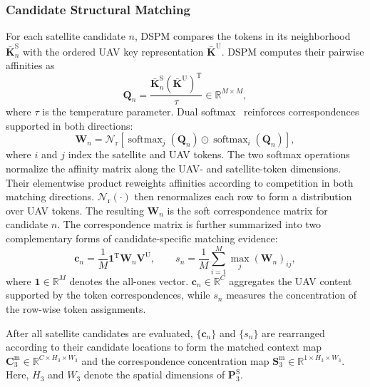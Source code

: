 \documentclass[runningheads]{llncs}
\begin{document}
\subsubsection{Candidate Structural Matching}

For each satellite candidate $n$, DSPM compares the tokens in its neighborhood $\bar{\mathbf{K}}_{n}^{\mathrm{S}}$ with the ordered UAV key representation $\bar{\mathbf{K}}^{\mathrm{U}}$. DSPM computes their pairwise affinities as 
\begin{equation}
\mathbf{Q}_{n}
=
\frac{
\bar{\mathbf{K}}_{n}^{\mathrm{S}}
(\bar{\mathbf{K}}^{\mathrm{U}})^{\mathrm{T}}
}{\tau}
\in \mathbb{R}^{M\times M},
\label{eq:dspm_affinity}
\end{equation}
where $\tau$ is the temperature parameter. Dual softmax~\cite{sun2021loftr} reinforces correspondences supported in both directions:
\begin{equation}
\mathbf{W}_{n}
=
\mathcal{N}_{\mathrm{r}}\!\left[
\operatorname{softmax}_{j}(\mathbf{Q}_{n})
\odot
\operatorname{softmax}_{i}(\mathbf{Q}_{n})
\right],
\label{eq:dspm_matching}
\end{equation}
where $i$ and $j$ index the satellite and UAV tokens. The two softmax operations normalize the affinity matrix along the UAV- and satellite-token dimensions. Their elementwise product reweights affinities according to competition in both matching directions. $\mathcal{N}_{\mathrm{r}}(\cdot)$ then renormalizes each row to form a distribution over UAV tokens. The resulting $\mathbf{W}_{n}$ is the soft correspondence matrix for candidate $n$. The correspondence matrix is further summarized into two complementary forms of candidate-specific matching evidence:
\begin{equation}
\mathbf{c}_{n}
=
\frac{1}{M}
\mathbf{1}^{\mathrm{T}}
\mathbf{W}_{n}
\mathbf{V}^{\mathrm{U}},
\qquad
s_{n}
=
\frac{1}{M}
\sum_{i=1}^{M}
\max_{j}
(\mathbf{W}_{n})_{ij},
\label{eq:dspm_evidence}
\end{equation}
where $\mathbf{1}\in\mathbb{R}^{M}$ denotes the all-ones vector. $\mathbf{c}_{n}\in\mathbb{R}^{C}$ aggregates the UAV content supported by the token correspondences, while $s_n$ measures the concentration of the row-wise token assignments.

After all satellite candidates are evaluated, $\{\mathbf{c}_{n}\}$ and $\{s_n\}$ are rearranged according to their candidate locations to form the matched context map $\mathbf{C}_{3}^{\mathrm{m}}\in\mathbb{R}^{C\times H_{3}\times W_{3}}$ and the correspondence concentration map $\mathbf{S}_{3}^{\mathrm{m}}\in\mathbb{R}^{1\times H_{3}\times W_{3}}$. Here, $H_{3}$ and $W_{3}$ denote the spatial dimensions of $\mathbf{P}_{3}^{\mathrm{S}}$.
\end{document}
